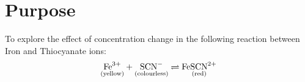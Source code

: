 
\section{Purpose}
To explore the effect of concentration change in the following reaction between Iron and Thiocyanate ions:
$$\rxn$$
